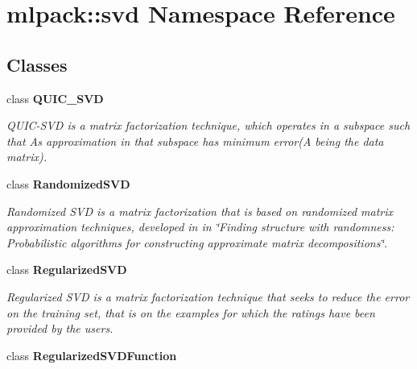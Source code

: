 \section{mlpack\+:\+:svd Namespace Reference}
\label{namespacemlpack_1_1svd}
\subsection*{Classes}
\begin{DoxyCompactItemize}
\item 
class {\bf Q\+U\+I\+C\+\_\+\+S\+VD}
\begin{DoxyCompactList}\small\item\em Q\+U\+I\+C-\/\+S\+VD is a matrix factorization technique, which operates in a subspace such that A\textquotesingle{}s approximation in that subspace has minimum error(A being the data matrix). \end{DoxyCompactList}\item 
class {\bf Randomized\+S\+VD}
\begin{DoxyCompactList}\small\item\em Randomized S\+VD is a matrix factorization that is based on randomized matrix approximation techniques, developed in in \char`\"{}\+Finding structure with randomness\+:
\+Probabilistic algorithms for constructing approximate matrix decompositions\char`\"{}. \end{DoxyCompactList}\item 
class {\bf Regularized\+S\+VD}
\begin{DoxyCompactList}\small\item\em Regularized S\+VD is a matrix factorization technique that seeks to reduce the error on the training set, that is on the examples for which the ratings have been provided by the users. \end{DoxyCompactList}\item 
class {\bf Regularized\+S\+V\+D\+Function}
\end{DoxyCompactItemize}
